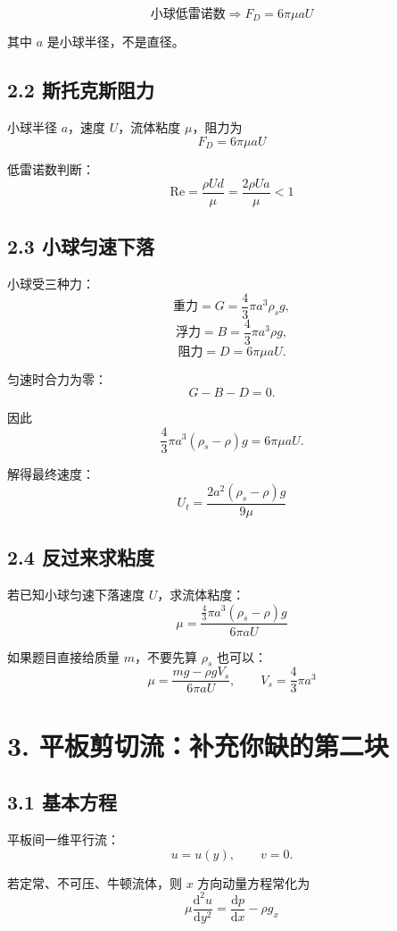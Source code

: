 ﻿\documentclass[12pt,a4paper]{ctexart}
\newcommand{\dd}{\mathrm d}
\newcommand{\Rey}{\mathrm{Re}}
\begin{document}
\[
\boxed{
\text{小球低雷诺数} \Rightarrow F_D=6\pi\mu aU
}
\]

其中 \(a\) 是小球半径，不是直径。

\subsection*{2.2 斯托克斯阻力}

小球半径 \(a\)，速度 \(U\)，流体粘度 \(\mu\)，阻力为
\[
\boxed{
F_D=6\pi\mu aU
}
\]

低雷诺数判断：
\[
\boxed{
\Rey=\frac{\rho Ud}{\mu}
=\frac{2\rho Ua}{\mu}<1
}
\]

\subsection*{2.3 小球匀速下落}

小球受三种力：
\[
\text{重力}=G=\frac43\pi a^3\rho_s g,
\]
\[
\text{浮力}=B=\frac43\pi a^3\rho g,
\]
\[
\text{阻力}=D=6\pi\mu aU.
\]

匀速时合力为零：
\[
G-B-D=0.
\]

因此
\[
\frac43\pi a^3(\rho_s-\rho)g=6\pi\mu aU.
\]

解得最终速度：
\[
\boxed{
U_t=\frac{2a^2(\rho_s-\rho)g}{9\mu}
}
\]

\subsection*{2.4 反过来求粘度}

若已知小球匀速下落速度 \(U\)，求流体粘度：
\[
\boxed{
\mu=
\frac{\frac43\pi a^3(\rho_s-\rho)g}{6\pi aU}
}
\]

如果题目直接给质量 \(m\)，不要先算 \(\rho_s\) 也可以：
\[
\boxed{
\mu=
\frac{mg-\rho gV_s}{6\pi aU},
\qquad
V_s=\frac43\pi a^3
}
\]

\section*{3. 平板剪切流：补充你缺的第二块}

\subsection*{3.1 基本方程}

平板间一维平行流：
\[
u=u(y),\qquad v=0.
\]

若定常、不可压、牛顿流体，则 \(x\) 方向动量方程常化为
\[
\boxed{
\mu\frac{\dd^2u}{\dd y^2}
=\frac{\dd p}{\dd x}-\rho g_x
}
\]
\end{document}
